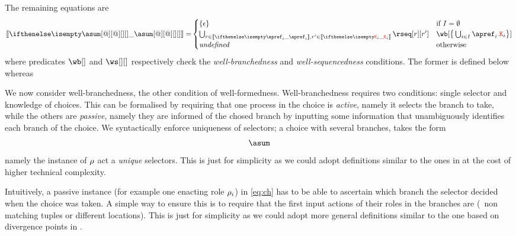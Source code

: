 The remaining equations are
%
\begin{align*}
  \ksem{\asum[@][@][][]} =
  &
    \begin{cases}
      \{ \emptypom \} & \text{if } I = \emptyset
      \\
      \bigcup_{\apom \in \ksem{\apref_i},\apom' \in \ksem{\aK_i}} \rseq[\apom][\apom']
      & \wb[{\big\{\bigcup_{i \in I}\apref_i\mkop{.}\aK_i\big\}}]
      \\
      \mathit{undefined} & \text{otherwise}
    \end{cases}
  \\
\end{align*}
where predicates $\wb[]$ and $\ws[][]$ respectively check the
\emph{well-branchedness} and \emph{well-sequencedness} conditions.
%
The former is defined below whereas

\hsl

We now consider well-branchedness, the other condition of
well-formedness.
%
Well-branchedness requires two conditions: single selector and knowledge of 
choices.
%
This can be formalised by requiring that one process in the choice is
\emph{active}, namely it selects the branch to take, while the others
are \emph{passive}, namely they are informed of the chosed branch by
inputting some information that unambiguously identifies each branch
of the choice.
%
%
We syntactically enforce uniqueness of selectors; a choice with
several branches, takes the form
\begin{align}
  \asum\label{eq:ch}
\end{align}
namely the instance of $\rho$ act a \emph{unique} selectors.
%
This is just for simplicity as we could adopt definitions similar to
the ones in \cite{gt16,gt17} at the cost of higher technical
complexity.

Intuitively, a passive instance (for example one enacting role
$\rho_i$) in \eqref{eq:ch} has to be able to ascertain which branch
the selector decided when the choice was taken.
%
A simple way to ensure this is to require that the first input actions
of their roles in the branches are  (\ie\ non matching
tuples or different locations).
%
This is just for simplicity as we could adopt more general definitions
similar to the one based on divergence points in \cite{gt16,gt17}.

